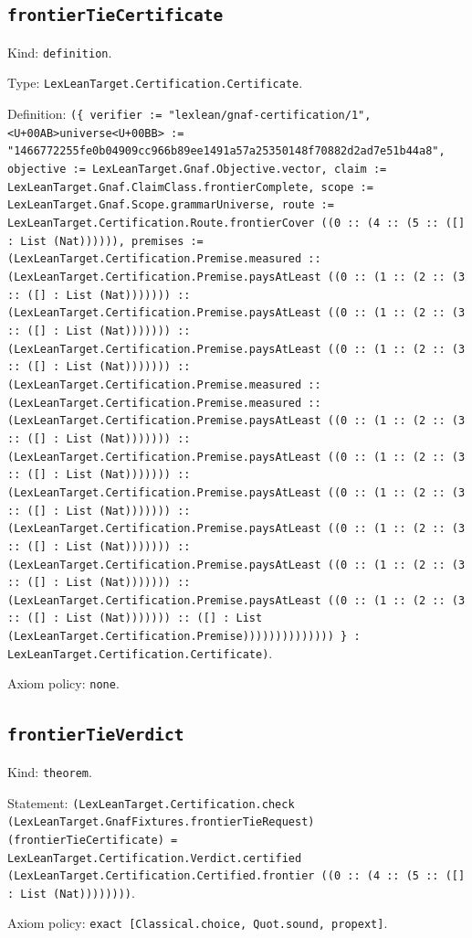 \documentclass[11pt]{article}
\begin{document}
\subsection*{\texttt{frontierTieCertificate}}
\noindent Kind: \texttt{definition}.\par
\noindent Type: \texttt{LexLeanTarget.Certification.Certificate}.\par
\noindent Definition: \texttt{(\{ verifier := "lexlean/gnaf-certification/1", <U+00AB>universe<U+00BB> := "1466772255fe0b04909cc966b89ee1491a57a25350148f70882d2ad7e51b44a8", objective := LexLeanTarget.Gnaf.Objective.vector, claim := LexLeanTarget.Gnaf.ClaimClass.frontierComplete, scope := LexLeanTarget.Gnaf.Scope.grammarUniverse, route := LexLeanTarget.Certification.Route.frontierCover ((0 :: (4 :: (5 :: ([] : List (Nat)))))), premises := (LexLeanTarget.Certification.Premise.measured :: (LexLeanTarget.Certification.Premise.paysAtLeast ((0 :: (1 :: (2 :: (3 :: ([] : List (Nat))))))) :: (LexLeanTarget.Certification.Premise.paysAtLeast ((0 :: (1 :: (2 :: (3 :: ([] : List (Nat))))))) :: (LexLeanTarget.Certification.Premise.paysAtLeast ((0 :: (1 :: (2 :: (3 :: ([] : List (Nat))))))) :: (LexLeanTarget.Certification.Premise.measured :: (LexLeanTarget.Certification.Premise.measured :: (LexLeanTarget.Certification.Premise.paysAtLeast ((0 :: (1 :: (2 :: (3 :: ([] : List (Nat))))))) :: (LexLeanTarget.Certification.Premise.paysAtLeast ((0 :: (1 :: (2 :: (3 :: ([] : List (Nat))))))) :: (LexLeanTarget.Certification.Premise.paysAtLeast ((0 :: (1 :: (2 :: (3 :: ([] : List (Nat))))))) :: (LexLeanTarget.Certification.Premise.paysAtLeast ((0 :: (1 :: (2 :: (3 :: ([] : List (Nat))))))) :: (LexLeanTarget.Certification.Premise.paysAtLeast ((0 :: (1 :: (2 :: (3 :: ([] : List (Nat))))))) :: (LexLeanTarget.Certification.Premise.paysAtLeast ((0 :: (1 :: (2 :: (3 :: ([] : List (Nat))))))) :: ([] : List (LexLeanTarget.Certification.Premise)))))))))))))) \} : LexLeanTarget.Certification.Certificate)}.\par
\noindent Axiom policy: \texttt{none}.\par
\subsection*{\texttt{frontierTieVerdict}}
\noindent Kind: \texttt{theorem}.\par
\noindent Statement: \texttt{(LexLeanTarget.Certification.check (LexLeanTarget.GnafFixtures.frontierTieRequest) (frontierTieCertificate) = LexLeanTarget.Certification.Verdict.certified (LexLeanTarget.Certification.Certified.frontier ((0 :: (4 :: (5 :: ([] : List (Nat))))))))}.\par
\noindent Axiom policy: \texttt{exact [Classical.choice, Quot.sound, propext]}.\par
\end{document}
